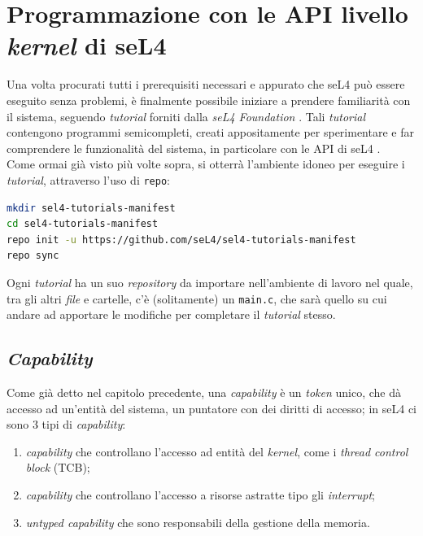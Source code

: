 \section{Programmazione con le API livello \textit{kernel} di seL4}
Una volta procurati tutti i prerequisiti necessari e appurato che seL4 può essere eseguito senza problemi, è finalmente possibile iniziare a prendere familiarità con il sistema, seguendo \textit{tutorial} forniti dalla \textit{seL4 Foundation} \cite{seL4Tutorial}. Tali \textit{tutorial} contengono programmi semicompleti, creati appositamente per sperimentare e far comprendere le funzionalità del sistema, in particolare con le API di seL4 \cite{sel4API}.\\
Come ormai già visto più volte sopra, si otterrà l'ambiente idoneo per eseguire i \textit{tutorial}, attraverso l'uso di \texttt{repo}:
\begin{lstlisting}[language=bash]
mkdir sel4-tutorials-manifest
cd sel4-tutorials-manifest
repo init -u https://github.com/seL4/sel4-tutorials-manifest
repo sync
\end{lstlisting}
Ogni \textit{tutorial} ha un suo \textit{repository} da importare nell'ambiente di lavoro nel quale, tra gli altri \textit{file} e cartelle, c'è (solitamente) un \texttt{main.c}, che sarà quello su cui andare ad apportare le modifiche per completare il \textit{tutorial} stesso.

\subsection{\textit{Capability}}
Come già detto nel capitolo precedente, una \textit{capability} è un \textit{token} unico, che dà accesso ad un'entità del sistema, un puntatore con dei diritti di accesso; in seL4 ci sono 3 tipi di \textit{capability}:
\begin{enumerate}
	\item \textit{capability} che controllano l'accesso ad entità del \textit{kernel}, come i \textit{thread control block} (TCB);
	\item \textit{capability} che controllano l'accesso a risorse astratte tipo gli \textit{interrupt};
	\item \textit{untyped capability} che sono responsabili della gestione della memoria.
\end{enumerate}

